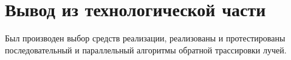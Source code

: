 \section{Вывод из технологической части}

Был производен выбор средств реализации, реализованы и протестированы последовательный и параллельный алгоритмы обратной трассировки лучей.
